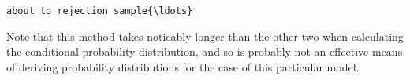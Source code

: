 \documentclass[11pt]{article}
\begin{document}
    \begin{Verbatim}[commandchars=\\\{\}]
about to rejection sample{\ldots}

    \end{Verbatim}

    Note that this method takes noticably longer than the other two when
calculating the conditional probability distribution, and so is probably
not an effective means of deriving probability distributions for the
case of this particular model.


    
    
    
    
\end{document}
